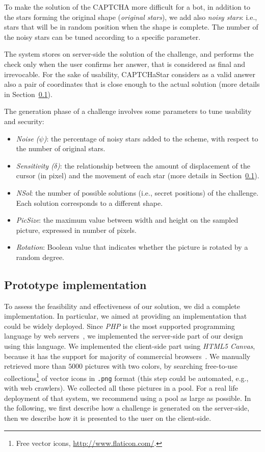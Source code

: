 \documentclass[conference]{IEEEtran}
\begin{document}
To make the solution of the CAPTCHA more difficult for a bot, in addition to the stars forming the original shape (\textit{original stars}), we add also \textit{noisy stars}: i.e., stars that will be in random position when the shape is complete.
The number of the noisy stars can be tuned according to a specific parameter. 

The system stores on server-side the solution of the challenge, and performs the  check only when the user confirms her answer, that is considered as final and irrevocable.
For the sake of usability,
CAPTCHaStar considers as a valid answer also a pair of coordinates that is close enough to the actual solution (more details in Section~\ref{prototypeimplementation}).

The generation phase of a challenge involves some parameters to tune usability and security: \label{generationparameters}
\begin{itemize} \item \textit{Noise ($\psi$)}: the percentage of noisy stars added to the scheme, with respect to the number of original stars.
  \item \textit{Sensitivity ($\delta$)}:
  the relationship between the amount of displacement of the cursor (in pixel) and the movement of each star  (more details in Section~\ref{prototypeimplementation}). 
\item \textit{NSol}: the number of possible solutions (i.e., secret positions) of the challenge.
  Each solution corresponds to a different shape.
  \item \textit{PicSize}: the maximum value between width and height on the sampled picture, expressed in number of pixels. \item \textit{Rotation}: Boolean value that indicates whether the picture is rotated by a random degree. \end{itemize}

\subsection{Prototype implementation}
\label{prototypeimplementation}
To assess the feasibility and effectiveness of our solution, we did a complete implementation.
In particular, we aimed at providing an implementation that could be widely deployed.
Since \textit{PHP} is the most supported programming language by web servers~\cite{commonserversidelanguage},
we implemented the server-side part of our design using this language.
We implemented the client-side part using \textit{HTML5 Canvas}, because it has the support for majority of commercial browsers~\cite{canvassupport}. 
We manually retrieved more than $5000$ pictures with two colors, by searching free-to-use collections\footnote{Free vector icons, \url{http://www.flaticon.com/}.} of vector icons in \texttt{.png} format (this step could be automated, e.g., with web crawlers).
We collected all these pictures in a pool. For a real life deployment of that system, we recommend using a pool as large as possible.
In the following, we first describe how a challenge is generated on the server-side, then we describe how it is presented to the user on the client-side.
\end{document}
